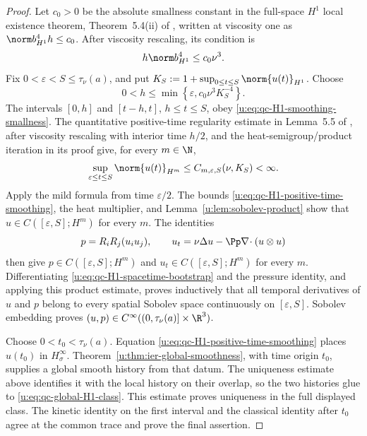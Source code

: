 \begin{proof}
Let \(c_0>0\) be the absolute smallness constant in the full-space
\(H^1\) local existence theorem, Theorem~5.4(ii) of \cite{Tao2013},
written at viscosity one as
\(\norm b_{H^1}^4h\le c_0\).  After viscosity rescaling, its condition is
\begin{equation}
 h\norm b_{H^1}^4\le c_0\nu^3.
 \label{u:eq:qc-H1-smoothing-smallness}
\end{equation}
Fix \(0<\varepsilon<S\le\tau_\nu(a)\), and put
\(K_S:=1+\sup_{0\le t\le S}\norm{u(t)}_{H^1}\).  Choose
\[
 0<h\le\min\left\{\varepsilon,
 c_0\nu^3K_S^{-4}\right\}.
\]
The intervals \([0,h]\) and \([t-h,t]\), \(h\le t\le S\), obey
\eqref{u:eq:qc-H1-smoothing-smallness}.  The quantitative positive-time
regularity estimate in Lemma~5.5 of \cite{Tao2013}, after viscosity
rescaling with interior time \(h/2\), and the
heat-semigroup/product iteration in its proof give, for every \(m\in\N\),
\begin{equation}
 \sup_{\varepsilon\le t\le S}\norm{u(t)}_{H^m}
 \le C_{m,\varepsilon,S}(\nu,K_S)<\infty.
 \label{u:eq:qc-H1-positive-time-smoothing}
\end{equation}
Apply the mild formula from time \(\varepsilon/2\).  The bounds
\eqref{u:eq:qc-H1-positive-time-smoothing}, the heat multiplier, and
Lemma~\ref{u:lem:sobolev-product} show that
\(u\in C([\varepsilon,S];H^m)\) for every \(m\).  The identities
\begin{equation}
 p=R_iR_j(u_i u_j),
 \qquad
 u_t=\nu\Delta u-\Pp\nabla\!\cdot(u\otimes u)
 \label{u:eq:qc-H1-spacetime-bootstrap}
\end{equation}
then give
\(p\in C([\varepsilon,S];H^m)\) and
\(u_t\in C([\varepsilon,S];H^m)\) for every \(m\).  Differentiating
\eqref{u:eq:qc-H1-spacetime-bootstrap} and the pressure identity, and applying
this product estimate, proves inductively that all temporal derivatives
of \(u\) and \(p\) belong to every spatial Sobolev space continuously on
\([\varepsilon,S]\).  Sobolev embedding proves
\((u,p)\in C^\infty((0,\tau_\nu(a)]\times\R^3)\).

Choose \(0<t_0<\tau_\nu(a)\).  Equation
\eqref{u:eq:qc-H1-positive-time-smoothing} places \(u(t_0)\) in
\(H^\infty_\sigma\).  Theorem~\ref{u:thm:ier-global-smoothness}, with time
origin \(t_0\), supplies a global smooth history from that datum.  The
uniqueness estimate above identifies it with the local history on their
overlap, so the two histories glue to \eqref{u:eq:qc-global-H1-class}.
This estimate proves uniqueness in the full displayed class.  The kinetic
identity on the first interval and the classical identity after \(t_0\) agree
at the common trace and prove the final assertion.
\end{proof}

